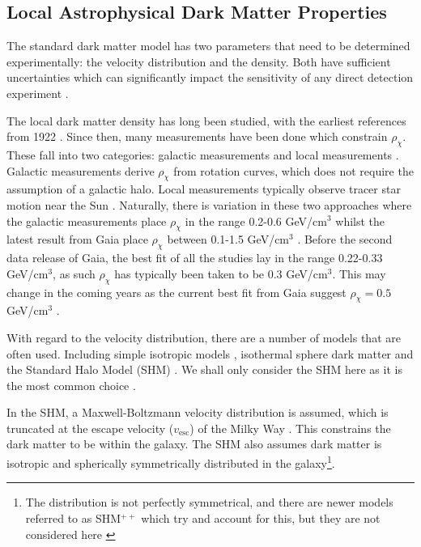 \subsection{Local Astrophysical Dark Matter Properties}
\par
The standard dark matter model has two parameters that need to be determined experimentally: the velocity distribution and the density. 
Both have sufficient uncertainties which can significantly impact the sensitivity of any direct detection experiment \cite{local_dm_uncertainties_ref}.
\par
The local dark matter density has long been studied, with the earliest references from 1922 \cite{first_dm_density_1_ref, first_dm_density_2_ref}.
Since then, many measurements have been done which constrain $\rho_{\chi}$.
These fall into two categories: galactic measurements and local measurements \cite{dm_density_ref}.
Galactic measurements derive $\rho_{\chi}$ from rotation curves, which does not require the assumption of a galactic halo.
Local measurements typically observe tracer star motion near the Sun \cite{gaia_tracer_dm_density_ref}.
Naturally, there is variation in these two approaches where the galactic measurements place $\rho_{\chi}$ in the range 0.2-0.6 GeV/cm$^3$ whilst the latest result from Gaia \cite{gaia_data_2_ref} place $\rho_{\chi}$ between 0.1-1.5 GeV/cm$^3$ \cite{gaia_dm_density_2_ref}.
Before the second data release of Gaia, the best fit of all the studies lay in the range 0.22-0.33 GeV/cm$^3$, as such $\rho_{\chi}$ has typically been taken to be 0.3 GeV/cm$^3$.
This may change in the coming years as the current best fit from Gaia suggest $\rho_{\chi}=0.5$ GeV/cm$^{3}$ \cite{gaia_dm_density_1_ref}.
\par
With regard to the velocity distribution, there are a number of models that are often used. 
Including simple isotropic models \cite{isotropic_dark_matter_models_ref}, isothermal sphere dark matter \cite{dm_velocity_isothermal_ref} and the Standard Halo Model (SHM) \cite{dm_velocity_shm_ref}. 
We shall only consider the SHM here as it is the most common choice \cite{dark_matter_distribution_models_ref}.
\par
In the SHM, a Maxwell-Boltzmann velocity distribution is assumed, which is truncated at the escape velocity ($v_{\text{esc}}$) of the Milky Way \cite{direct_dark_matter_of_wimps_concepts_ref}.
This constrains the dark matter to be within the galaxy.
The SHM also assumes dark matter is isotropic and spherically symmetrically distributed in the galaxy\footnote{The distribution is not perfectly symmetrical, and there are newer models referred to as SHM$^{++}$ which try and account for this, but they are not considered here \cite{extended_shm_ref}}.
